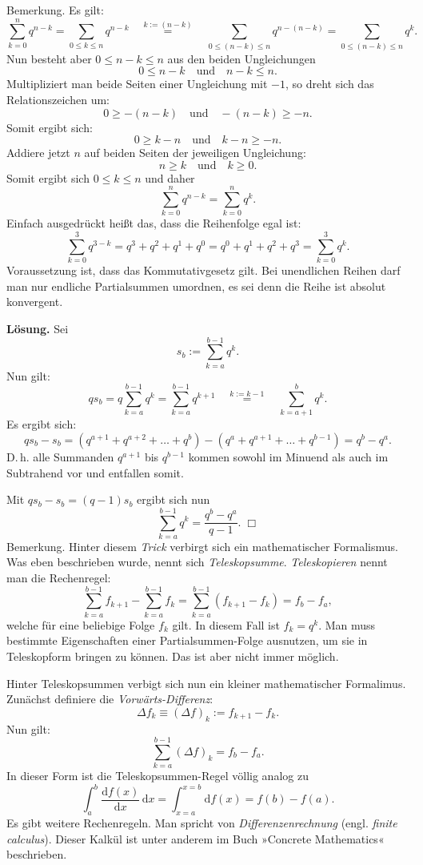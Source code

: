 \documentclass[a4paper,10pt,fleqn,twoside]{scrartcl}
\numberwithin{equation}{section}
\newcommand{\strong}[1]{{\normalfont\sffamily\bfseries #1}}
\theoremstyle{Aufgabe}
\begin{document}
\noindent
Bemerkung. Es gilt:
\[\sum_{k=0}^n q^{n-k} = \sum_{0\le k\le n} q^{n-k}
\quad\stackrel{k:=(n-k)}=\quad\sum_{0\le (n-k)\le n} q^{n-(n-k)}
= \sum_{0\le (n-k)\le n} q^k.
\]
Nun besteht aber $0\le n-k\le n$ aus den beiden Ungleichungen
\[0\le n-k\quad\text{und}\quad n-k\le n.\]
Multipliziert man beide Seiten einer Ungleichung mit $-1$, so dreht
sich das Relationszeichen um:
\[0\ge -(n-k)\quad\text{und}\quad -(n-k)\ge -n.\]
Somit ergibt sich:
\[0\ge k-n\quad\text{und}\quad k-n\ge -n.\]
Addiere jetzt $n$ auf beiden Seiten der jeweiligen Ungleichung:
\[n\ge k\quad\text{und}\quad k\ge 0.\]
Somit ergibt sich $0\le k\le n$ und daher
\[\sum_{k=0}^n q^{n-k} = \sum_{k=0}^n q^k.\]
Einfach ausgedrückt heißt das, dass die Reihenfolge egal ist:
\[\sum_{k=0}^3 q^{3-k} = q^3+q^2+q^1+q^0 = q^0+q^1+q^2+q^3 = \sum_{k=0}^3 q^k.\]
Voraussetzung ist, dass das Kommutativgesetz gilt. Bei unendlichen
Reihen darf man nur endliche Partialsummen umordnen, es sei denn
die Reihe ist absolut konvergent.

\strong{Lösung.} Sei
\[s_b := \sum_{k=a}^{b-1} q^k.\]
Nun gilt:
\[qs_b = q\sum_{k=a}^{b-1} q^k = \sum_{k=a}^{b-1} q^{k+1}
\quad\stackrel{k:=k-1}=\quad\sum_{k=a+1}^b q^k.\]
Es ergibt sich:
\[qs_b-s_b = (q^{a+1}+q^{a+2}+\ldots+q^{b})-(q^a+q^{a+1}+\ldots+q^{b-1}) = q^b-q^a.\]
D.\,h. alle Summanden $q^{a+1}$ bis $q^{b-1}$ kommen sowohl im Minuend als auch im Subtrahend vor und
entfallen somit.

Mit $qs_b-s_b=(q-1)s_b$ ergibt sich nun
\[\sum_{k=a}^{b-1} q^k = \frac{q^b-q^a}{q-1}.\;\Box\]
Bemerkung. Hinter diesem \emph{Trick} verbirgt sich ein mathematischer
Formalismus. Was eben beschrieben wurde, nennt sich
\emph{Teleskopsumme}. \emph{Teleskopieren} nennt man die Rechenregel:
\[\sum_{k=a}^{b-1} f_{k+1} - \sum_{k=a}^{b-1} f_k
= \sum_{k=a}^{b-1} (f_{k+1}-f_k) = f_b-f_a,\]
welche für eine beliebige Folge $f_k$ gilt. In diesem Fall ist
$f_k=q^k$. Man muss bestimmte Eigenschaften einer Partialsummen-Folge
ausnutzen, um sie in Teleskopform bringen zu können. Das ist aber nicht
immer möglich.

Hinter Teleskopsummen verbigt sich nun ein kleiner mathematischer
Formalimus. Zunächst definiere die \emph{Vorwärts-Differenz}:
\[\Delta f_k\equiv (\Delta f)_k := f_{k+1}-f_k.\]
Nun gilt:
\[\sum_{k=a}^{b-1} (\Delta f)_k = f_b-f_a.\]
In dieser Form ist die Teleskopsummen-Regel völlig analog zu
\[\int_a^b \frac{\mathrm df(x)}{\mathrm dx}\,\mathrm dx
= \int_{x=a}^{x=b} \mathrm df(x) = f(b)-f(a).\]
Es gibt weitere Rechenregeln. Man spricht von \emph{Differenzenrechnung}
(engl. \emph{finite calculus}). Dieser Kalkül ist unter anderem
im Buch »Concrete Mathematics« beschrieben.
\end{document}
